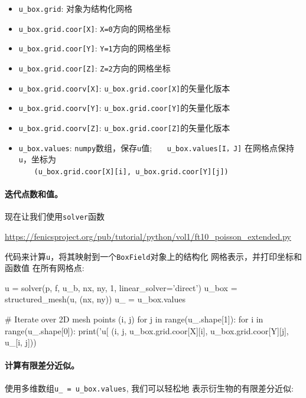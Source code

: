 \begin{itemize}
 \item \verb!u_box.grid!: 对象为结构化网格

 \item \verb!u_box.grid.coor[X]!: \texttt{X=0}方向的网格坐标

 \item \verb!u_box.grid.coor[Y]!: \texttt{Y=1}方向的网格坐标

 \item \verb!u_box.grid.coor[Z]!: \texttt{Z=2}方向的网格坐标

 \item \verb!u_box.grid.coorv[X]!: \verb!u_box.grid.coor[X]!的矢量化版本

 \item \verb!u_box.grid.coorv[Y]!: \verb!u_box.grid.coor[Y]!的矢量化版本

 \item \verb!u_box.grid.coorv[Z]!: \verb!u_box.grid.coor[Z]!的矢量化版本

 \item \verb!u_box.values!: \texttt{numpy}数组，保存\texttt{u}值;
   \verb!u_box.values[I，J]! 在网格点保持\texttt{u}，坐标为\\
    \verb!(u_box.grid.coor[X][i], u_box.grid.coor[Y][j])!
\end{itemize}

\noindent
\paragraph{迭代点数和值。}
现在让我们使用\texttt{solver}函数
\begin{center}
\url{https://fenicsproject.org/pub/tutorial/python/vol1/ft10_poisson_extended.py}
\end{center}
代码来计算\texttt{u}，将其映射到一个\texttt{BoxField}对象上的结构化
网格表示，并打印坐标和函数值
在所有网格点:

\begin{python}
u = solver(p, f, u_b, nx, ny, 1, linear_solver='direct')
u_box = structured_mesh(u, (nx, ny))
u_ = u_box.values

# Iterate over 2D mesh points (i, j)
for j in range(u_.shape[1]):
    for i in range(u_.shape[0]):
        print('u[%
              (i, j,
               u_box.grid.coor[X][i], u_box.grid.coor[Y][j],
               u_[i, j]))
\end{python}

\paragraph{计算有限差分近似。}
使用多维数组\verb!u_ = u_box.values!, 我们可以轻松地
表示衍生物的有限差分近似:

